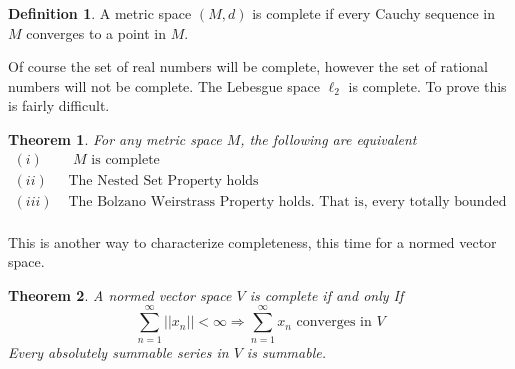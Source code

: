 \documentclass{article}
\newtheorem{theorem}{Theorem}[section]
\theoremstyle{definition}
\newtheorem{definition}{Definition}[section]
\begin{document}
    \begin{definition}
        A metric space $(M,d)$ is complete if every Cauchy sequence in $M$ converges to a point in $M$.
    \end{definition}
    Of course the set of real numbers will be complete, however the set of rational numbers will not be complete.
    The Lebesgue space $\ell_2$ is complete. To prove this is fairly difficult.
    \begin{mdframed}
        \begin{theorem}
            For any metric space $M$, the following are equivalent
            \begin{align*}
                (i) & \text{ $M$ is complete}\\
                (ii) & \text{ The Nested Set Property holds}\\
                (iii) & \text{ The Bolzano Weirstrass Property holds. 
                That is, every totally bounded set has a limit point}\\
            \end{align*}
        \end{theorem}
    \end{mdframed}
    This is another way to characterize completeness, this time for a normed vector space.
    \begin{mdframed}
        \begin{theorem}
            A normed vector space $V$ is complete if and only If
            \[
                \sum_{n=1}^\infty ||x_n|| < \infty \Rightarrow \sum_{n=1}^\infty x_n \text { converges in $V$}    
            \]
            Every absolutely summable series in $V$ is summable.
        \end{theorem}
    \end{mdframed}
\end{document}
